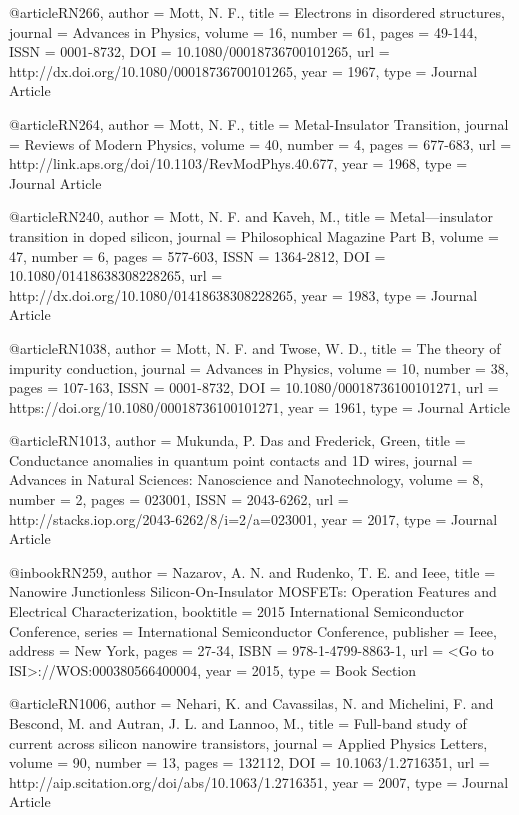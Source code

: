 @article{RN266,
   author = {Mott, N. F.},
   title = {Electrons in disordered structures},
   journal = {Advances in Physics},
   volume = {16},
   number = {61},
   pages = {49-144},
   ISSN = {0001-8732},
   DOI = {10.1080/00018736700101265},
   url = {http://dx.doi.org/10.1080/00018736700101265},
   year = {1967},
   type = {Journal Article}
}

@article{RN264,
   author = {Mott, N. F.},
   title = {Metal-Insulator Transition},
   journal = {Reviews of Modern Physics},
   volume = {40},
   number = {4},
   pages = {677-683},
   url = {http://link.aps.org/doi/10.1103/RevModPhys.40.677},
   year = {1968},
   type = {Journal Article}
}

@article{RN240,
   author = {Mott, N. F. and Kaveh, M.},
   title = {Metal—insulator transition in doped silicon},
   journal = {Philosophical Magazine Part B},
   volume = {47},
   number = {6},
   pages = {577-603},
   ISSN = {1364-2812},
   DOI = {10.1080/01418638308228265},
   url = {http://dx.doi.org/10.1080/01418638308228265},
   year = {1983},
   type = {Journal Article}
}

@article{RN1038,
   author = {Mott, N. F. and Twose, W. D.},
   title = {The theory of impurity conduction},
   journal = {Advances in Physics},
   volume = {10},
   number = {38},
   pages = {107-163},
   ISSN = {0001-8732},
   DOI = {10.1080/00018736100101271},
   url = {https://doi.org/10.1080/00018736100101271},
   year = {1961},
   type = {Journal Article}
}

@article{RN1013,
   author = {Mukunda, P. Das and Frederick, Green},
   title = {Conductance anomalies in quantum point contacts and 1D wires},
   journal = {Advances in Natural Sciences: Nanoscience and Nanotechnology},
   volume = {8},
   number = {2},
   pages = {023001},
   ISSN = {2043-6262},
   url = {http://stacks.iop.org/2043-6262/8/i=2/a=023001},
   year = {2017},
   type = {Journal Article}
}

@inbook{RN259,
   author = {Nazarov, A. N. and Rudenko, T. E. and Ieee},
   title = {Nanowire Junctionless Silicon-On-Insulator MOSFETs: Operation Features and Electrical Characterization},
   booktitle = {2015 International Semiconductor Conference},
   series = {International Semiconductor Conference},
   publisher = {Ieee},
   address = {New York},
   pages = {27-34},
   ISBN = {978-1-4799-8863-1},
   url = {<Go to ISI>://WOS:000380566400004},
   year = {2015},
   type = {Book Section}
}

@article{RN1006,
   author = {Nehari, K. and Cavassilas, N. and Michelini, F. and Bescond, M. and Autran, J. L. and Lannoo, M.},
   title = {Full-band study of current across silicon nanowire transistors},
   journal = {Applied Physics Letters},
   volume = {90},
   number = {13},
   pages = {132112},
   DOI = {10.1063/1.2716351},
   url = {http://aip.scitation.org/doi/abs/10.1063/1.2716351},
   year = {2007},
   type = {Journal Article}
}

